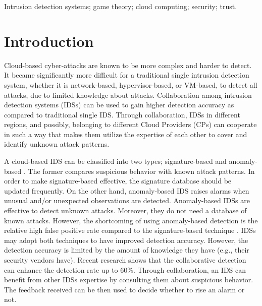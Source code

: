 \documentclass[conference]{IEEEtran}
\begin{document}
\begin{IEEEkeywords}
Intrusion detection systems; game theory; cloud computing; security; trust.
\end{IEEEkeywords}


%
\IEEEpeerreviewmaketitle



\section{Introduction}

Cloud-based cyber-attacks are known to be more complex and harder to detect. It became significantly more difficult for a traditional single intrusion detection system, whether it is network-based, hypervisor-based, or VM-based, to detect all attacks, due to limited knowledge about attacks. Collaboration among intrusion detection systems (IDSs) can be used to gain higher detection accuracy as compared to traditional single IDS. Through collaboration, IDSs in different regions, and possibly, belonging to different Cloud Providers (CPs) can cooperate in such a way that makes them utilize the expertise of each other to cover and identify unknown attack patterns.

A cloud-based IDS can be classified into two types; signature-based and anomaly-based \cite{modi2013survey}. The former compares suspicious behavior with known attack patterns. In order to make signature-based effective, the signature database should be updated frequently.  On the other hand, anomaly-based IDS raises alarms when unusual and/or unexpected observations are detected. Anomaly-based IDSs are effective to detect unknown attacks. Moreover, they do not need a database of known attacks. However, the shortcoming of using anomaly-based detection is the relative high false positive rate compared to the signature-based technique \cite{fung2016facid}. IDSs may adopt both techniques to have improved detection accuracy. However, the detection accuracy is limited by the amount of knowledge they have (e.g., their security vendors have). Recent research \cite{fung2016facid} \cite{fung2014revmatch} shows that the collaborative detection can enhance the detection rate up to 60\%. Through collaboration, an IDS can benefit from other IDSs expertise by consulting them about suspicious behavior. The feedback received can be then used to decide whether to rise an alarm or not. %
\end{document}
